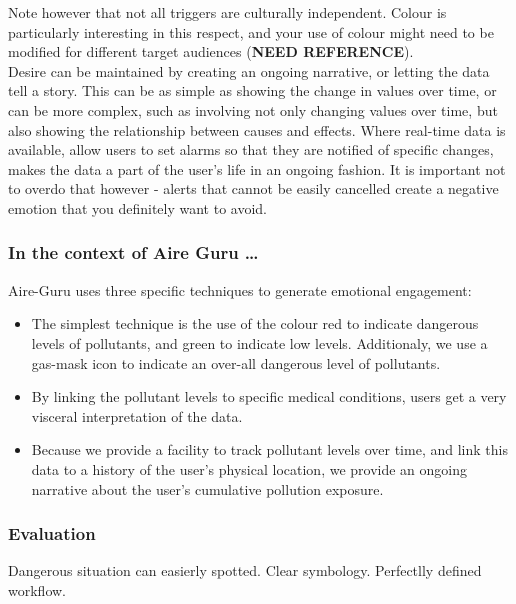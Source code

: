 Note however that not all triggers are culturally independent. Colour is particularly interesting in this respect, and your use of colour might
need to be modified for different target audiences (\textbf{NEED REFERENCE}). \\

Desire can be maintained by creating an ongoing narrative, or letting the data tell a story. This can be as simple as showing the change in 
values over time, or can be more complex, such as involving not only changing values over time, but also showing the relationship between causes and
effects. Where real-time data is available, allow users to set alarms so that they are notified of specific changes, makes the data a part of the user's
life in an ongoing fashion. It is important not to overdo that however - alerts that cannot be easily cancelled create a negative emotion that you
definitely want to avoid. \\

\subsubsection*{In the context of Aire Guru \ldots}

Aire-Guru uses three specific techniques to generate emotional engagement:

\begin{itemize}

    \item The simplest technique is the use of the colour red to indicate dangerous levels of pollutants, and green to indicate low levels.
    Additionaly, we use a gas-mask icon to indicate an over-all dangerous level of pollutants.

    \item By linking the pollutant levels to specific medical conditions, users get a very visceral interpretation of the data.
    
    \item Because we provide a facility to track pollutant levels over time, and link this data to a history of the user's physical location, we provide
    an ongoing narrative about the user's cumulative pollution exposure.

\end{itemize}

\subsubsection*{Evaluation}  

\begin{itemize}
    \done Dangerous situation can easierly spotted.
    \done Clear symbology.
    \done Perfectlly defined workflow.
    \crossed
\end{itemize}
